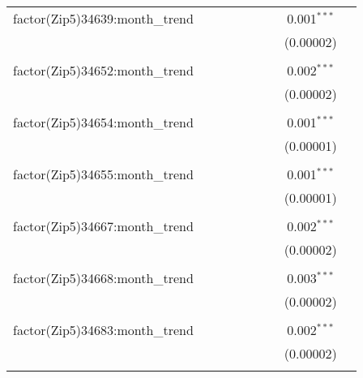 \begin{table}[H]
{\begin{tabular}{@{\extracolsep{5pt}}lcccccccc}
  factor(Zip5)34639:month\_trend &  &  &  &  &  &  & 0.001$^{***}$ &  \\  

   &  &  &  &  &  &  & (0.00002) &  \\  

   & & & & & & & & \\  

  factor(Zip5)34652:month\_trend &  &  &  &  &  &  & 0.002$^{***}$ &  \\  

   &  &  &  &  &  &  & (0.00002) &  \\  

   & & & & & & & & \\  

  factor(Zip5)34654:month\_trend &  &  &  &  &  &  & 0.001$^{***}$ &  \\  

   &  &  &  &  &  &  & (0.00001) &  \\  

   & & & & & & & & \\  

  factor(Zip5)34655:month\_trend &  &  &  &  &  &  & 0.001$^{***}$ &  \\  

   &  &  &  &  &  &  & (0.00001) &  \\  

   & & & & & & & & \\  

  factor(Zip5)34667:month\_trend &  &  &  &  &  &  & 0.002$^{***}$ &  \\  

   &  &  &  &  &  &  & (0.00002) &  \\  

   & & & & & & & & \\  

  factor(Zip5)34668:month\_trend &  &  &  &  &  &  & 0.003$^{***}$ &  \\  

   &  &  &  &  &  &  & (0.00002) &  \\  

   & & & & & & & & \\  

  factor(Zip5)34683:month\_trend &  &  &  &  &  &  & 0.002$^{***}$ &  \\  

   &  &  &  &  &  &  & (0.00002) &  \\  

   & & & & & & & & \\  


\end{tabular}}
\end{table}
